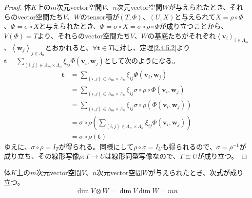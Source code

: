 \documentclass[dvipdfmx]{jsarticle}
\begin{document}
\begin{proof}
体$K$上の$m$次元vector空間$V$、$n$次元vector空間$W$が与えられたとき、それらのvector空間たち$V$、$W$のtensor積が$(T,\varPhi)$、$(U,X)$と与えられて$X = \rho \circ \varPhi$、$\varPhi = \sigma \circ X$と与えられたとき、$\varPhi = \sigma \circ X = \sigma \circ \rho \circ \varPhi$が成り立つことから、$V(\varPhi) = T$より、それらのvector空間たち$V$、$W$の基底たちがそれぞれ$\left\langle \mathbf{v}_{i} \right\rangle_{i \in \varLambda_{m}}$、$\left\langle \mathbf{w}_{j} \right\rangle_{j \in \varLambda_{n}}$とおかれると、$\forall\mathbf{t} \in T$に対し、定理\ref{2.4.5.2}より$\mathbf{t} = \sum_{(i,j) \in \varLambda_{m} \times \varLambda_{n}} {\xi_{ij}\varPhi\left( \mathbf{v}_{i},\mathbf{w}_{j} \right)}$として次のようになる。
\begin{align*}
\mathbf{t} &= \sum_{(i,j) \in \varLambda_{m} \times \varLambda_{n}} {\xi_{ij}\varPhi\left( \mathbf{v}_{i},\mathbf{w}_{j} \right)}\\
&= \sum_{(i,j) \in \varLambda_{m} \times \varLambda_{n}} {\xi_{ij}\sigma \circ \rho \circ \varPhi\left( \mathbf{v}_{i},\mathbf{w}_{j} \right)}\\
&= \sum_{(i,j) \in \varLambda_{m} \times \varLambda_{n}} {\xi_{ij}\sigma \circ \rho\left( \varPhi\left( \mathbf{v}_{i},\mathbf{w}_{j} \right) \right)}\\
&= \sigma \circ \rho\left( \sum_{(i,j) \in \varLambda_{m} \times \varLambda_{n}} {\xi_{ij}\varPhi\left( \mathbf{v}_{i},\mathbf{w}_{j} \right)} \right) \\
&= \sigma \circ \rho\left( \mathbf{t} \right)
\end{align*}
ゆえに、$\sigma \circ \rho = I_{T}$が得られる。同様にして$\rho \circ \sigma = I_{U}$も得られるので、$\sigma = \rho^{- 1}$が成り立ち、その線形写像$\rho:T \rightarrow U$は線形同型写像なので、$T \cong U$が成り立つ。
\end{proof}
\begin{thm}\label{2.4.5.5}
体$K$上の$m$次元vector空間$V$、$n$次元vector空間$W$が与えられたとき、次式が成り立つ。
\begin{align*}
\dim{V \otimes W} = \dim V\dim W = mn
\end{align*}
\end{thm}
\end{document}
